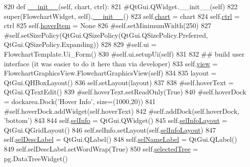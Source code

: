 \begin{DoxyCode}
820     \textcolor{keyword}{def }\hyperlink{classFlowchart_1_1FlowchartWidget_a02971e7ae11a9290a1ac25861f53fee7}{\_\_init\_\_}(self, chart, ctrl):
821         \textcolor{comment}{#QtGui.QWidget.\_\_init\_\_(self)}
822         super(FlowchartWidget, self).\hyperlink{classFlowchart_1_1FlowchartWidget_a02971e7ae11a9290a1ac25861f53fee7}{\_\_init\_\_}()
823         self.\hyperlink{classFlowchart_1_1FlowchartWidget_a3eea10235556d1d25b05c4e5f37fa324}{chart} = chart
824         self.\hyperlink{classFlowchart_1_1FlowchartWidget_adf3b7937106a3e532bd2d56ea9df365d}{ctrl} = ctrl
825         self.\hyperlink{classFlowchart_1_1FlowchartWidget_a00653ef4736026c5bf0aae462690d250}{hoverItem} = \textcolor{keywordtype}{None}
826         \textcolor{comment}{#self.setMinimumWidth(250)}
827         \textcolor{comment}{#self.setSizePolicy(QtGui.QSizePolicy(QtGui.QSizePolicy.Preferred, QtGui.QSizePolicy.Expanding))}
828         
829         \textcolor{comment}{#self.ui = FlowchartTemplate.Ui\_Form()}
830         \textcolor{comment}{#self.ui.setupUi(self)}
831         
832         \textcolor{comment}{## build user interface (it was easier to do it here than via developer)}
833         self.\hyperlink{classFlowchart_1_1FlowchartWidget_a8ee88da9be1a80e14f5cd4445ee9817e}{view} = FlowchartGraphicsView.FlowchartGraphicsView(self)
834         
835         layout = QtGui.QHBoxLayout()
836         self.setLayout(layout)        
837         
838         \textcolor{comment}{#self.hoverText = QtGui.QTextEdit()}
839         \textcolor{comment}{#self.hoverText.setReadOnly(True)}
840         \textcolor{comment}{#self.hoverDock = dockarea.Dock('Hover Info', size=(1000,20))}
841         \textcolor{comment}{#self.hoverDock.addWidget(self.hoverText)}
842         \textcolor{comment}{#self.addDock(self.hoverDock, 'bottom')}
843 
844         self.\hyperlink{classFlowchart_1_1FlowchartWidget_a417ef3e95c1853de2b30c6ecd0058c0c}{selInfo} = QtGui.QWidget()
845         self.\hyperlink{classFlowchart_1_1FlowchartWidget_a5a95852906fbff5e7406f447e1843b72}{selInfoLayout} = QtGui.QGridLayout()
846         self.selInfo.setLayout(self.\hyperlink{classFlowchart_1_1FlowchartWidget_a5a95852906fbff5e7406f447e1843b72}{selInfoLayout})
847         self.\hyperlink{classFlowchart_1_1FlowchartWidget_a125c2e77ef484511338053bcd60dc20c}{selDescLabel} = QtGui.QLabel()
848         self.\hyperlink{classFlowchart_1_1FlowchartWidget_a3a9d580264503de8d51279bc0ab7fb28}{selNameLabel} = QtGui.QLabel()
849         self.selDescLabel.setWordWrap(\textcolor{keyword}{True})
850         self.\hyperlink{classFlowchart_1_1FlowchartWidget_a4309a7cf46d773c98800badec5c93f52}{selectedTree} = pg.DataTreeWidget()

\end{DoxyCode}
